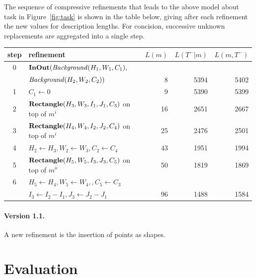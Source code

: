 \documentclass[a4paper]{llncs}
\begin{document}
The sequence of compressive refinements that leads to the above model
about task in Figure~\ref{fig:task} is shown in the table below,
giving after each refinement the new values for description
lengths. For concision, successive unknown replacements are aggregated
into a single step.

\begin{center}
  \begin{tabular}{|c|l|r|r|r|}
    \hline
    step & refinement & $L(m)$ & $L(T^-|m)$ & $L(m,T^-)$ \\
    \hline
    0 & ${\bf InOut}({\it Background}(H_1,W_1,C_1),$ & & & \\
    & \hspace*{1.1cm}${\it Background}(H_2,W_2,C_2))$ & 8 & 5394 & 5402 \\
    1 & $C_1 \leftarrow 0$ & 9 & 5390 & 5399 \\
    2 & ${\bf Rectangle}(H_3,W_3,I_1,J_1,C_3)$ on top of $m^i$ & 16 & 2651 & 2667 \\
    3 & ${\bf Rectangle}(H_4,W_4,I_2,J_2,C_4)$ on top of $m^i$ & 25 & 2476 & 2501 \\
    4 & $H_2 \leftarrow H_3, W_2 \leftarrow W_3, C_2 \leftarrow C_4$ & 43 & 1951 & 1994 \\
    5 & ${\bf Rectangle}(H_5,W_5,I_3,J_3, C_5)$ on top of $m^o$ & 50 & 1819 & 1869 \\
    6 & $H_5 \leftarrow H_4, W_5 \leftarrow W_4,, C_5 \leftarrow C_3$ & & & \\
     & \hspace*{1cm} $I_3 \leftarrow I_2-I_1, J_3 \leftarrow J_2-J_1$ & 96 & 1488 & 1584 \\
    \hline
  \end{tabular}
\end{center}


\paragraph{Version 1.1.} A new refinement is the insertion of points
as shapes.

\section{Evaluation}
\label{eval}
\end{document}
